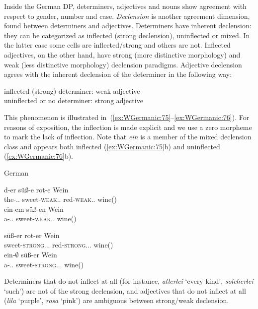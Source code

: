 \documentclass[output=paper,hidelinks]{langscibook}
\begin{document}
Inside the German DP, determiners, adjectives and nouns show agreement
with respect to gender, number and case. \textit{Declension}
is another agreement dimension, found between determiners and
adjectives. Determiners have inherent declension: they can be
categorized as inflected (strong declension), uninflected or mixed. In the latter
case some cells are inflected/strong and others are
not. Inflected adjectives, on the other hand, have strong (more
distinctive morphology) and weak (less distinctive morphology)
declension paradigms. Adjective declension agrees with the inherent declension
of the determiner in the following way:
%
\begin{exe}
  \ex inflected (strong) determiner: weak adjective\\
      uninflected or no determiner: strong adjective
\end{exe}
%
This phenomenon is illustrated in~(\ref{ex:WGermanic:75}--\ref{ex:WGermanic:76}). For reasons of
exposition, the inflection is made explicit and we use a zero morpheme
to mark the lack of inflection. Note that \textit{ein} is a member of
the mixed declension class and appears both inflected (\ref{ex:WGermanic:75}b) and uninflected (\ref{ex:WGermanic:76}b).
\begin{exe}
  \ex\label{ex:WGermanic:75} German \citep[data from][§3.2, presentation/glosses changed]{Dipper05}
  \begin{xlist}
    \ex \gll d-er sü{\ss}-e rot-e Wein\\
        the-\M.\SG.\NOM{} sweet-\textsc{weak}.\SG.\NOM{} red-\textsc{weak}.\SG.\NOM{} wine(\M)\\
    \ex \gll ein-em sü{\ss}-en Wein\\
             a-\M.\SG.\DAT{} sweet-\textsc{weak}.\SG.\DAT{} wine(\M)\\
    \end{xlist}
  \ex\label{ex:WGermanic:76}
  \begin{xlist}
    \ex \gll sü{\ss}-er rot-er Wein\\
        sweet-\textsc{strong}.\M.\SG.\NOM{} red-\textsc{strong}.\M.\SG.\NOM{} wine(\M)\\
    \ex \gll ein-$\emptyset$ sü{\ss}-er Wein\\
             a-\M.\SG.\NOM{} sweet-\textsc{strong}.\M.\SG.\NOM{} wine(\M)\\
    \end{xlist}
\end{exe}
Determiners that do not inflect at all (for instance, \textit{allerlei} `every kind', \textit{solcherlei} `such') are not of
the strong declension, and adjectives that do not inflect at all
(\textit{lila} `purple', \textit{rosa} `pink') are ambiguous between
strong/weak declension.
\end{document}
